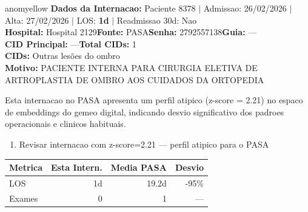 \documentclass[a4paper,10pt]{article}
\begin{document}
\begin{anomalycard}[Internacao 184503 | PASA | MODERADO (z=2.21)]{anomyellow}
\textbf{Dados da Internacao:} Paciente 8378 $\mid$ Admissao: 26/02/2026 $\mid$ Alta: 27/02/2026 $\mid$ LOS: \textbf{1d} $\mid$ Readmissao 30d: Nao\\
\textbf{Hospital:} Hospital 2129\quad\textbf{Fonte:} PASA\quad\textbf{Senha:} 2792557138\quad\textbf{Guia:} ---\\
\textbf{CID Principal:} {\small ---}\quad\textbf{Total CIDs:} 1\\

\textbf{CIDs:} {\scriptsize Outras lesões do ombro}\\

\textbf{Motivo:} {\scriptsize PACIENTE INTERNA PARA CIRURGIA ELETIVA DE ARTROPLASTIA  DE OMBRO AOS CUIDADOS DA ORTOPEDIA}\\

\vspace{2pt}\begin{tcolorbox}[colback=severityred!20,colframe=anomyellow,title={\textbf{Interpretacao de Negocio}},fonttitle=\bfseries\small,left=4pt,right=4pt,top=3pt,bottom=3pt]
{\small Esta internacao no PASA apresenta um perfil atipico (z-score = 2.21) no espaco de embeddings do gemeo digital, indicando desvio significativo dos padroes operacionais e clinicos habituais.}
\end{tcolorbox}
\begin{tcolorbox}[colback=severityyellow!30,colframe=anomorange,title={\textbf{Recomendacoes Especificas}},fonttitle=\bfseries\small,left=4pt,right=4pt,top=3pt,bottom=3pt]
\begin{enumerate}[nosep,leftmargin=16pt]
\item {\small Revisar internacao com z-score=2.21 --- perfil atipico para o PASA}
\end{enumerate}
\end{tcolorbox}
\begin{center}\begin{tabular}{l r r r}\toprule\textbf{Metrica} & \textbf{Esta Intern.} & \textbf{Media PASA} & \textbf{Desvio} \\\midrule
LOS & 1d & 19.2d & -95\% \\
Exames & 0 & 1 & --- \\
\bottomrule\end{tabular}\end{center}


\end{anomalycard}
\end{document}

